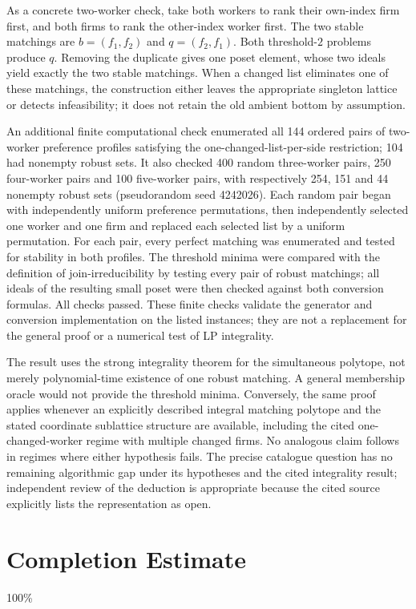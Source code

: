 \documentclass[11pt,a4paper]{article}
\begin{document}
As a concrete two-worker check, take both workers to rank their own-index firm first, and both firms to rank the other-index worker first. The two stable matchings are $b=(f_1,f_2)$ and $q=(f_2,f_1)$. Both threshold-$2$ problems produce $q$. Removing the duplicate gives one poset element, whose two ideals yield exactly the two stable matchings. When a changed list eliminates one of these matchings, the construction either leaves the appropriate singleton lattice or detects infeasibility; it does not retain the old ambient bottom by assumption.

An additional finite computational check enumerated all 144 ordered pairs of two-worker preference profiles satisfying the one-changed-list-per-side restriction; 104 had nonempty robust sets. It also checked 400 random three-worker pairs, 250 four-worker pairs and 100 five-worker pairs, with respectively 254, 151 and 44 nonempty robust sets (pseudorandom seed 4242026). Each random pair began with independently uniform preference permutations, then independently selected one worker and one firm and replaced each selected list by a uniform permutation. For each pair, every perfect matching was enumerated and tested for stability in both profiles. The threshold minima were compared with the definition of join-irreducibility by testing every pair of robust matchings; all ideals of the resulting small poset were then checked against both conversion formulas. All checks passed. These finite checks validate the generator and conversion implementation on the listed instances; they are not a replacement for the general proof or a numerical test of LP integrality.

The result uses the strong integrality theorem for the simultaneous polytope, not merely polynomial-time existence of one robust matching. A general membership oracle would not provide the threshold minima. Conversely, the same proof applies whenever an explicitly described integral matching polytope and the stated coordinate sublattice structure are available, including the cited one-changed-worker regime with multiple changed firms. No analogous claim follows in regimes where either hypothesis fails. The precise catalogue question has no remaining algorithmic gap under its hypotheses and the cited integrality result; independent review of the deduction is appropriate because the cited source explicitly lists the representation as open.

\section{Completion Estimate}
100\%
\end{document}
